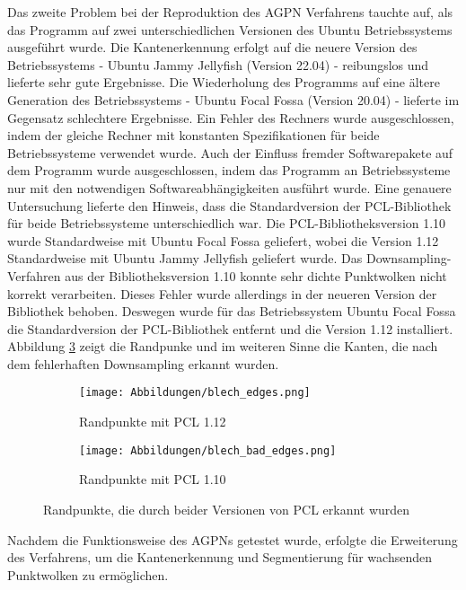 Das zweite Problem bei der Reproduktion des AGPN Verfahrens tauchte auf, als das Programm auf zwei unterschiedlichen Versionen des Ubuntu Betriebssystems ausgeführt wurde. Die Kantenerkennung erfolgt auf die neuere Version des Betriebssystems - Ubuntu Jammy Jellyfish (Version 22.04) - reibungslos und lieferte sehr gute Ergebnisse. Die Wiederholung des Programms auf eine ältere Generation des Betriebssystems - Ubuntu Focal Fossa (Version 20.04) - lieferte im Gegensatz schlechtere Ergebnisse. Ein Fehler des Rechners wurde ausgeschlossen, indem der gleiche Rechner mit konstanten Spezifikationen für beide Betriebssysteme verwendet wurde. Auch der Einfluss fremder Softwarepakete auf dem Programm wurde ausgeschlossen, indem das Programm an Betriebssysteme nur mit den notwendigen Softwareabhängigkeiten ausführt wurde. Eine genauere Untersuchung lieferte den Hinweis, dass die Standardversion der PCL-Bibliothek für beide Betriebssysteme unterschiedlich war. Die PCL-Bibliotheksversion 1.10 wurde Standardweise mit Ubuntu Focal Fossa geliefert, wobei die Version 1.12 Standardweise mit Ubuntu Jammy Jellyfish geliefert wurde. Das Downsampling-Verfahren aus der Bibliotheksversion 1.10 konnte sehr dichte Punktwolken nicht korrekt verarbeiten. Dieses Fehler wurde allerdings in der neueren Version der Bibliothek behoben. Deswegen wurde für das Betriebssystem Ubuntu Focal Fossa die Standardversion der PCL-Bibliothek entfernt und die Version 1.12 installiert. Abbildung \ref{fig: pcl_version_comparision} zeigt die Randpunke und im weiteren Sinne die Kanten, die nach dem fehlerhaften Downsampling erkannt wurden.

\begin{figure}[h]
	\centering
	\begin{subfigure}[h]{0.95\textwidth}
		\texttt{[image: Abbildungen/blech\_edges.png]}
		\centering
		\caption{Randpunkte mit PCL 1.12}
		\label{fig: blech_edges}
	\end{subfigure}
	\hfill
	\begin{subfigure}[h]{0.95\textwidth}
		\texttt{[image: Abbildungen/blech\_bad\_edges.png]}
		\centering
		\caption{Randpunkte mit PCL 1.10}
		\label{fig: bad_edges}
	\end{subfigure}
	\caption{Randpunkte, die durch beider Versionen von PCL erkannt wurden}
	\label{fig: pcl_version_comparision}
\end{figure}

Nachdem die Funktionsweise des AGPNs getestet wurde, erfolgte die Erweiterung des Verfahrens, um die Kantenerkennung und Segmentierung für wachsenden Punktwolken zu ermöglichen.

